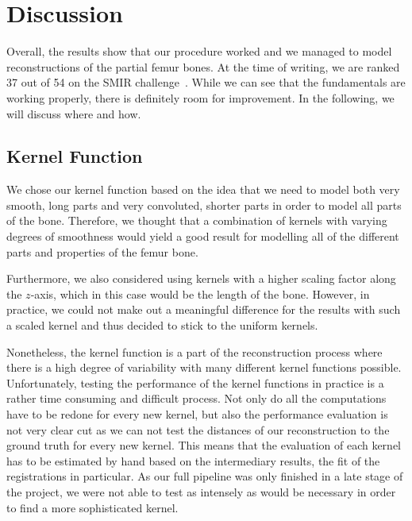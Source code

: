 \section{Discussion}
\label{sec:discussion}
Overall, the results show that our procedure worked and we managed to model reconstructions of the partial femur bones. 
At the time of writing, we are ranked 37 out of 54 on the SMIR challenge~\cite{smir}. 
While we can see that the fundamentals are working properly, there is definitely room for improvement. 
In the following, we will discuss where and how.
		

\subsection{Kernel Function}
\label{subsec:kernfuncdisc}
We chose our kernel function based on the idea that we need to model both very smooth, long parts and very convoluted, shorter parts in order to model all parts of the bone. 
Therefore, we thought that a combination of kernels with varying degrees of smoothness would yield a good result for modelling all of the different parts and properties of the femur bone. 

Furthermore, we also considered using kernels with a higher scaling factor along the $z$-axis, which in this case would be the length of the bone. 
However, in practice, we could not make out a meaningful difference for the results with such a scaled kernel and thus decided to stick to the uniform kernels.

Nonetheless, the kernel function is a part of the reconstruction process where there is a high degree of variability with many different kernel functions possible. 
Unfortunately, testing the performance of the kernel functions in practice is a rather time consuming and difficult process.
Not only do all the computations have to be redone for every new kernel, but also the performance evaluation is not very clear cut as we can not test the distances of our reconstruction to the ground truth for every new kernel.
This means that the evaluation of each kernel has to be estimated by hand based on the intermediary results, the fit of the registrations in particular. 
As our full pipeline was only finished in a late stage of the project, we were not able to test as intensely as would be necessary in order to find a more sophisticated kernel.

